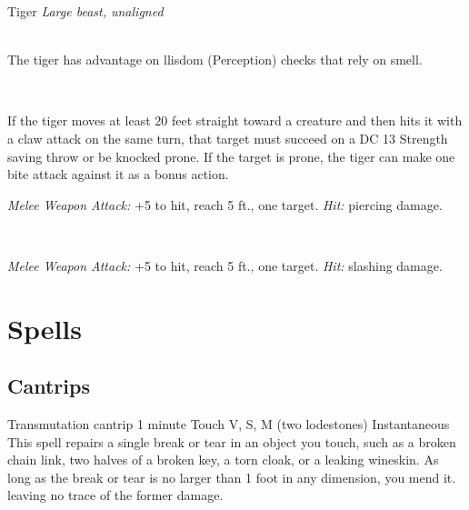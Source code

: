 \documentclass[10pt,twoside,twocolumn,openany]{book}
\begin{document}
\begin{monsterboxnobg}{Tiger}
	\textit{Large beast, unaligned}\\
	\hline
	\basics[
		armorclass	= 12,
		hitpoints		= \dice{5d10 + 10},
		speed		= {40 ft.}
	]
	\hline
	\stats[
		STR	= \stat{17},
		DEX	= \stat{15},
		CON	= \stat{14},
		INT	= \stat{3},
		WIS	= \stat{12},
		CHA	= \stat{8}
	]
	\hline
	\details[
		skills			= {Perception +3, Stealth +6},
		senses		= {darkvision 60 ft., passive Perception 13},
		languages		= {-},
		challenge		= 1
	]
	\hline \\[1mm]
	\begin{monsteraction}
		The tiger has advantage on llisdom (Perception) checks that rely on smell.
	\end{monsteraction}\\
	\begin{monsteraction}[Pounce]
		If the tiger moves at least 20 feet straight toward a creature and then hits it with a claw attack on the same turn, that target must succeed on a DC 13 Strength saving throw or be knocked prone. If the target is prone, the tiger can make one bite attack against it as a bonus action.
	\end{monsteraction}
	\begin{monsteraction}[Bite]
		\textit{Melee Weapon Attack:} +5 to hit, reach 5 ft., one target. \textit{Hit:}  piercing damage.
	\end{monsteraction}\\
	\begin{monsteraction}[Claw]
		\textit{Melee Weapon Attack:} +5 to hit, reach 5 ft., one target. \textit{Hit:}  slashing damage.
	\end{monsteraction}
\end{monsterboxnobg}

\chapter{Spells}
\section{Cantrips}
{Transmutation cantrip}
{1 minute}
{Touch}
{V, S, M (two lodestones)}
{Instantaneous}
%
This spell repairs a single break or tear in an object you touch, such as a broken chain link, two halves of a broken key, a torn cloak, or a leaking wineskin. As long as the break or tear is no larger than 1 foot in any dimension, you mend it. leaving no trace of the former damage.
\end{document}
